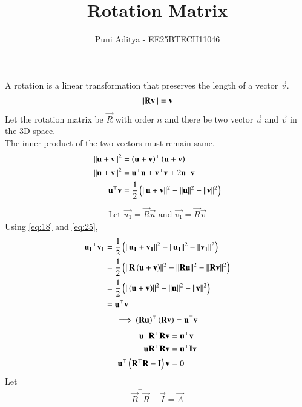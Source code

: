 \documentclass[journal]{IEEEtran}
\title{Rotation Matrix}
\author{Puni Aditya - EE25BTECH11046}
\begin{document}
\maketitle

A rotation is a linear transformation that preserves the length of a vector $\vec{v}$.
\begin{align}
    \left\lVert\mathbf{R}\mathbf{v}\right\rVert = \mathbf{v} \label{eq:18}
\end{align}
Let the rotation matrix be $\vec{R}$ with order $n$ and there be two vector $\vec{u}$ and $\vec{v}$ in the 3D space. \\
The inner product of the two vectors must remain same.
\begin{align}
    \left\lVert\mathbf{u}+\mathbf{v}\right\rVert^2 &= \left(\mathbf{u}+\mathbf{v}\right)^\top\left(\mathbf{u}+\mathbf{v}\right) \\
    \left\lVert\mathbf{u}+\mathbf{v}\right\rVert^2 &= \mathbf{u}^\top\mathbf{u}+\mathbf{v}^\top\mathbf{v} + 2\mathbf{u}^\top\mathbf{v} \\
    \mathbf{u}^\top\mathbf{v} &= \frac{1}{2}\left(\left\lVert\mathbf{u}+\mathbf{v}\right\rVert^2 - \left\lVert\mathbf{u}\right\rVert^2 - \left\lVert\mathbf{v}\right\rVert^2\right) \label{eq:25}
\end{align}
\begin{align}
    \text{Let }\vec{u_1} = \vec{R}\vec{u}\text{ and }\vec{v_1} = \vec{R}\vec{v}
\end{align}
Using \eqref{eq:18} and \eqref{eq:25}, 
\begin{align}
    \mathbf{u_1}^\top\mathbf{v_1} &= \frac{1}{2}\left(\left\lVert\mathbf{u_1}+\mathbf{v_1}\right\rVert^2 - \left\lVert\mathbf{u_1}\right\rVert^2 - \left\lVert\mathbf{v_1}\right\rVert^2\right) \\
    &= \frac{1}{2}\left(\left\lVert\mathbf{R}\left(\mathbf{u}+\mathbf{v}\right)\right\rVert^2 - \left\lVert\mathbf{R}\mathbf{u}\right\rVert^2 - \left\lVert\mathbf{R}\mathbf{v}\right\rVert^2\right) \\
    &= \frac{1}{2}\left(\left\lVert\left(\mathbf{u}+\mathbf{v}\right)\right\rVert^2 - \left\lVert\mathbf{u}\right\rVert^2 - \left\lVert\mathbf{v}\right\rVert^2\right) \\
    &= \mathbf{u}^\top\mathbf{v}
\end{align}
\begin{align} 
    \implies \left(\mathbf{R}\mathbf{u}\right)^\top \left(\mathbf{R}\mathbf{v}\right) = \mathbf{u}^\top \mathbf{v}
\end{align}
\begin{align}
    \mathbf{u}^\top\mathbf{R}^\top\mathbf{R}\mathbf{v} &= \mathbf{u}^\top \mathbf{v} \\
    \mathbf{u}\mathbf{R}^\top\mathbf{R}\mathbf{v} &= \mathbf{u}^\top\mathbf{I}\mathbf{v} \\
    \mathbf{u}^\top\left(\mathbf{R}^\top\mathbf{R}-\mathbf{I}\right)\mathbf{v} &= 0 \label{eq:43}
\end{align}
Let
\begin{align*}
    \vec{R}^\top\vec{R}-\vec{I} = \vec{A}
\end{align*}
\end{document}

